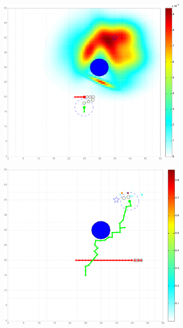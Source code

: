 \documentclass[twocolumn,10pt]{asme2e}
\begin{document}
\begin{figure}
\begin{subfigure}[b]{0.2\textwidth}
		\caption{}\label{fig:clt_1_sim_1ststep}
	\end{subfigure}
	\begin{subfigure}[b]{0.2\textwidth}
		\includegraphics[width=\textwidth]{figures/clt_1_sim1_1_newcm1}
		\caption{}\label{fig:clt_1_sim_avoid_h_1}
	\end{subfigure}
	\begin{subfigure}[b]{0.2\textwidth}
		\includegraphics[width=\textwidth]{figures/clt_1_sim1_end_newcm1}

\end{subfigure}
\end{figure}
\end{document}

